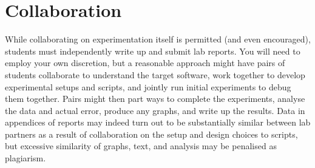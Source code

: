 \documentclass[a4paper,10pt]{article}
\begin{document}
\section*{Collaboration}

While collaborating on experimentation itself is permitted (and even
encouraged), students must independently write up and submit lab reports.
You will need to employ your own discretion, but a reasonable approach might
have pairs of students collaborate to understand the target software, work
together to develop experimental setups and scripts, and jointly run initial
experiments to debug them together.
Pairs might then part ways to complete the experiments, analyse the data and
actual error, produce any graphs, and write up the results.
Data in appendices of reports may indeed turn out to be substantially similar
between lab partners as a result of collaboration on the setup and design
choices to scripts, but excessive similarity of graphs, text, and analysis
may be penalised as plagiarism.
\end{document}
